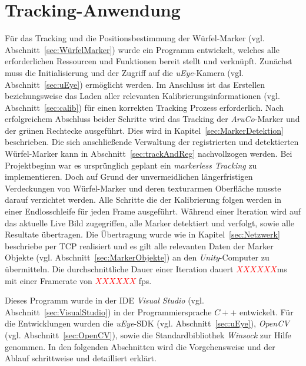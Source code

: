 \section{Tracking-Anwendung} \label{sec:Tracking}
Für das Tracking und die Positionsbestimmung der Würfel-Marker (vgl. Abschnitt~\ref{sec:WürfelMarker}) wurde ein Programm entwickelt, welches alle erforderlichen Ressourcen und Funktionen bereit stellt und verknüpft. Zunächst muss die Initialisierung und der Zugriff auf die \textit{uEye}-Kamera (vgl. Abschnitt~\ref{sec:uEye}) ermöglicht werden. Im Anschluss ist das Erstellen beziehungsweise das Laden aller relevanten Kalibrierungsinformationen (vgl. Abschnitt~\ref{sec:calib}) für einen korrekten Tracking Prozess erforderlich. Nach erfolgreichem Abschluss beider Schritte wird das Tracking der \textit{AruCo}-Marker und der grünen Rechtecke ausgeführt. Dies wird in Kapitel~\ref{sec:MarkerDetektion} beschrieben. Die sich anschließende Verwaltung der registrierten und detektierten Würfel-Marker kann in Abschnitt~\ref{sec:trackAndReg} nachvollzogen werden. Bei Projektbeginn war es ursprünglich geplant ein \textit{markerless Tracking} zu implementieren. Doch auf Grund der unvermeidlichen längerfristigen Verdeckungen von Würfel-Marker und deren texturarmen Oberfläche musste darauf verzichtet werden.
Alle Schritte die der Kalibrierung folgen werden in einer Endlosschleife für jeden Frame ausgeführt. Während einer Iteration wird auf das aktuelle Live Bild zugegriffen, alle Marker detektiert und verfolgt, sowie alle Resultate übertragen. Die Übertragung wurde wie in Kapitel~\ref{sec:Netzwerk} beschriebe per TCP realisiert und es gilt alle relevanten Daten der Marker Objekte (vgl. Abschnitt~\ref{sec:MarkerObjekte}) an den \textit{Unity}-Computer zu übermitteln. Die durchschnittliche Dauer einer Iteration dauert \textcolor{red}{$XXXXXX$}ms mit einer Framerate von \textcolor{red}{$XXXXXX$} fps. 

Dieses Programm wurde in der IDE \textit{Visual Studio} (vgl. Abschnitt~\ref{sec:VisualStudio}) in der Programmiersprache $C++$ entwickelt. Für die Entwicklungen wurden die \textit{uEye}-SDK (vgl. Abschnitt~\ref{sec:uEye}), \textit{OpenCV} (vgl. Abschnitt~\ref{sec:OpenCV}), sowie die Standardbibliothek \textit{Winsock} zur Hilfe genommen. In den folgenden Abschnitten wird die Vorgehensweise und der Ablauf schrittweise und detailliert erklärt.

